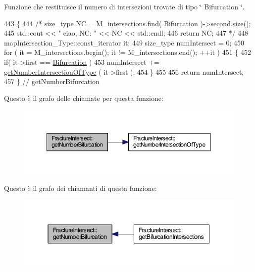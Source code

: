 Funzione che restituisce il numero di intersezioni trovate di tipo \char`\"{} Bifurcation \char`\"{}. 


\begin{DoxyCode}
443 \{
444     \textcolor{comment}{/*  size\_type NC = M\_intersections.find( Bifurcation )->second.size();}
445 \textcolor{comment}{        std::cout << " ciao, NC: " << NC << std::endl;}
446 \textcolor{comment}{        return NC;}
447 \textcolor{comment}{    */}
448         mapIntersection\_Type::const\_iterator it;
449         size\_type numIntersect = 0;
450         \textcolor{keywordflow}{for} ( it = M\_intersections.begin(); it != M\_intersections.end(); ++it )
451         \{
452         \textcolor{keywordflow}{if}( it->first == \hyperlink{classFractureIntersect_a9a4e4a784fa4c8e359767ed543f89dc5a4d466b3d3de0af7e18732b6f765bb1af}{Bifurcation} )
453                 numIntersect += \hyperlink{classFractureIntersect_a1cd070dda9460d884c1b1d92edfecc12}{getNumberIntersectionOfType} ( it->first );
454         \}
455 
456         \textcolor{keywordflow}{return} numIntersect;
457 \} \textcolor{comment}{// getNumberBifurcation}
\end{DoxyCode}


Questo è il grafo delle chiamate per questa funzione\-:\nopagebreak
\begin{figure}[H]
\begin{center}
\leavevmode
\includegraphics[width=350pt]{classFractureIntersect_afba7c92096a4b92a27fcb4f1158c7279_cgraph}
\end{center}
\end{figure}




Questo è il grafo dei chiamanti di questa funzione\-:\nopagebreak
\begin{figure}[H]
\begin{center}
\leavevmode
\includegraphics[width=345pt]{classFractureIntersect_afba7c92096a4b92a27fcb4f1158c7279_icgraph}
\end{center}
\end{figure}


